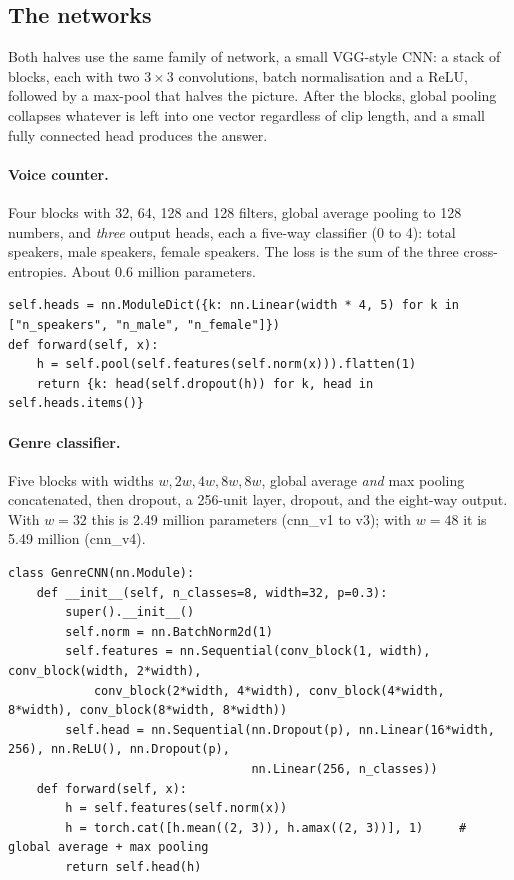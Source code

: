 \documentclass[11pt]{article}
\begin{document}
\subsection{The networks}
Both halves use the same family of network, a small VGG-style CNN: a stack of blocks, each with two $3{\times}3$ convolutions, batch normalisation and a ReLU, followed by a max-pool that halves the picture. After the blocks, global pooling collapses whatever is left into one vector regardless of clip length, and a small fully connected head produces the answer.

\paragraph{Voice counter.} Four blocks with 32, 64, 128 and 128 filters, global average pooling to 128 numbers, and \emph{three} output heads, each a five-way classifier (0 to 4): total speakers, male speakers, female speakers. The loss is the sum of the three cross-entropies. About 0.6 million parameters.
\begin{lstlisting}
self.heads = nn.ModuleDict({k: nn.Linear(width * 4, 5) for k in ["n_speakers", "n_male", "n_female"]})
def forward(self, x):
    h = self.pool(self.features(self.norm(x))).flatten(1)
    return {k: head(self.dropout(h)) for k, head in self.heads.items()}
\end{lstlisting}

\paragraph{Genre classifier.} Five blocks with widths $w, 2w, 4w, 8w, 8w$, global average \emph{and} max pooling concatenated, then dropout, a 256-unit layer, dropout, and the eight-way output. With $w=32$ this is 2.49 million parameters (cnn\_v1 to v3); with $w=48$ it is 5.49 million (cnn\_v4).
\begin{lstlisting}
class GenreCNN(nn.Module):
    def __init__(self, n_classes=8, width=32, p=0.3):
        super().__init__()
        self.norm = nn.BatchNorm2d(1)
        self.features = nn.Sequential(conv_block(1, width), conv_block(width, 2*width),
            conv_block(2*width, 4*width), conv_block(4*width, 8*width), conv_block(8*width, 8*width))
        self.head = nn.Sequential(nn.Dropout(p), nn.Linear(16*width, 256), nn.ReLU(), nn.Dropout(p),
                                  nn.Linear(256, n_classes))
    def forward(self, x):
        h = self.features(self.norm(x))
        h = torch.cat([h.mean((2, 3)), h.amax((2, 3))], 1)     # global average + max pooling
        return self.head(h)
\end{lstlisting}
\end{document}
